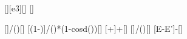 [\kilo\electronvolt][e3][\electronvolt]
[\degree]

[]{\nchX*\nccX/(\EgX*\nceX)}[\m]
[\left(1-\cos\theta\right)]{\nchX/(\ncmeX*\nccX)*(1-cosd(\thtX))}[\m]
[\lambda+\Delta\lambda]{\laX+\dlX}[\m]
[]{\nchX*\nccX/(\lbX*\nceX)}[\electronvolt]
[E-E']{\EgX-\EsX}[\electronvolt]
